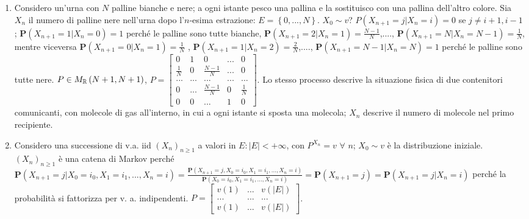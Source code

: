 \documentclass{article}
\begin{document}
\begin{enumerate}
\item Considero un'urna con $N$ palline bianche e nere; a ogni istante pesco
una pallina e la sostituisco con una pallina dell'altro colore. Sia $X_{n}$
il numero di palline nere nell'urna dopo l'$n$-esima estrazione: $E=\left\{
0,...,N\right\} $. $X_{0}\sim v$? $P\left( X_{n+1}=j|X_{n}=i\right) =0$ se $%
j\neq i+1,i-1$; $\mathbf{P}\left( X_{n+1}=1|X_{n}=0\right) =1$ perch\'{e} le
palline sono tutte bianche, $\mathbf{P}\left( X_{n+1}=2|X_{n}=1\right) =%
\frac{N-1}{N}$,...., $\mathbf{P}\left( X_{n+1}=N|X_{n}=N-1\right) =\frac{1}{N%
}$, mentre viceversa $\mathbf{P}\left( X_{n+1}=0|X_{n}=1\right) =\frac{1}{N}$%
, $\mathbf{P}\left( X_{n+1}=1|X_{n}=2\right) =\frac{2}{N}$,...., $\mathbf{P}%
\left( X_{n+1}=N-1|X_{n}=N\right) =1$ perch\'{e} le palline sono tutte nere. 
$P\in M_{%
\mathbb{R}
}\left( N+1,N+1\right) $, $P=\left[ 
\begin{array}{ccccc}
0 & 1 & 0 & ... & 0 \\ 
\frac{1}{N} & 0 & \frac{N-1}{N} & ... & 0 \\ 
... & ... & ... & ... & ... \\ 
0 & ... & \frac{N-1}{N} & 0 & \frac{1}{N} \\ 
0 & 0 & ... & 1 & 0%
\end{array}%
\right] $. Lo stesso processo descrive la situazione fisica di due
contenitori comunicanti, con molecole di gas all'interno, in cui a ogni
istante si sposta una molecola; $X_{n}$ descrive il numero di molecole nel
primo recipiente.

\item Considero una successione di v.a. iid $\left( X_{n}\right) _{n\geq 1}$
a valori in $E:\left\vert E\right\vert <+\infty $, con $P^{X_{n}}=v$ $%
\forall $ $n$; $X_{0}\sim v$ \`{e} la distribuzione iniziale. $\left(
X_{n}\right) _{n\geq 1}$ \`{e} una catena di Markov perch\'{e} $\mathbf{P}%
\left( X_{n+1}=j|X_{0}=i_{0},X_{1}=i_{1},...,X_{n}=i\right) =\frac{\mathbf{P}%
\left( X_{n+1}=j,X_{0}=i_{0},X_{1}=i_{1},...,X_{n}=i\right) }{\mathbf{P}%
\left( X_{0}=i_{0},X_{1}=i_{1},...,X_{n}=i\right) }=\mathbf{P}\left(
X_{n+1}=j\right) =\mathbf{P}\left( X_{n+1}=j|X_{n}=i\right) $ perch\'{e} la
probabilit\`{a} si fattorizza per v. a. indipendenti. $P=\left[ 
\begin{array}{ccc}
v\left( 1\right) & ... & v\left( \left\vert E\right\vert \right) \\ 
... & ... & ... \\ 
v\left( 1\right) & ... & v\left( \left\vert E\right\vert \right)%
\end{array}%
\right] $.
\end{enumerate}
\end{document}
